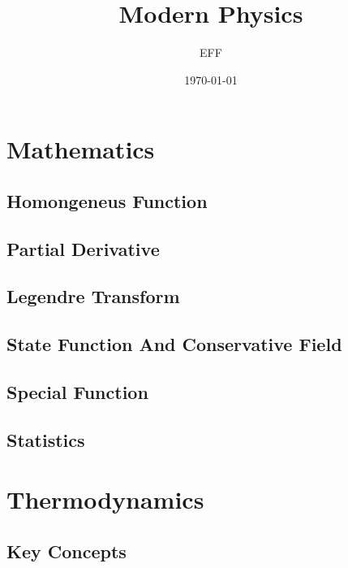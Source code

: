 \documentclass[10pt]{report}
\title{Modern Physics}
\author{EFF}
\date{\today}
\begin{document}
\pagestyle{empty}

\nocite{Boas2005}\nocite{Faisca2022}\nocite{Puri2024}\nocite{Serway2014}

\chapter*{Mathematics}
\section*{Homongeneus Function}
\clearpage

\section*{Partial Derivative}
\clearpage

\section*{Legendre Transform}
\clearpage

\section*{State Function And Conservative Field}
\clearpage

\section*{Special Function}
\clearpage 

\section*{Statistics}


\chapter*{Thermodynamics}

\section*{Key Concepts}
\clearpage
\end{document}
